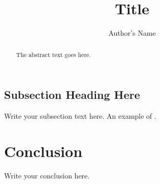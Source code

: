 \documentclass{article}
\begin{document}
\title{Title}
\author{Author's Name}

\maketitle

\begin{abstract}
The abstract text goes here.
\end{abstract}



\subsection{Subsection Heading Here}
Write your subsection text here.
An example of .


\section{Conclusion}
Write your conclusion here.
\end{document}
